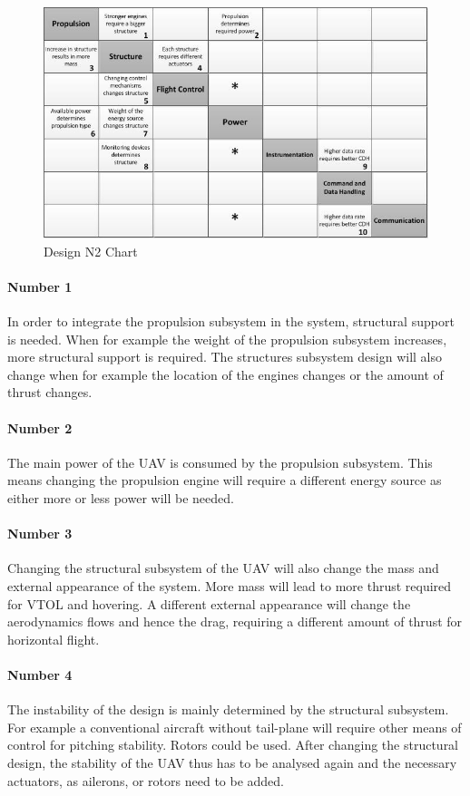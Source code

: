 \begin{figure}[htb]
\includegraphics[width=\textwidth]{./Interfaces/Figures/N2Chart.jpg}
\caption{Design N2 Chart}
\label{fig:N2}
\end{figure}

\paragraph{Number 1} In order to integrate the propulsion subsystem in the system, structural support is needed. When for example the weight of the propulsion subsystem increases, more structural support is required. The structures subsystem design will also change when for example the location of the engines changes or the amount of thrust changes.

\paragraph{Number 2} The main power of the UAV is consumed by the propulsion subsystem. This means changing the propulsion engine will require a different energy source as either more or less power will be needed.

\paragraph{Number 3} Changing the structural subsystem of the UAV will also change the mass and external appearance of the system. More mass will lead to more thrust required for VTOL and hovering. A different external appearance will change the aerodynamics flows and hence the drag, requiring a different amount of thrust for horizontal flight. 

\paragraph{Number 4} The instability of the design is mainly determined by the structural subsystem. For example a conventional aircraft without tail-plane will require other means of control for pitching stability. Rotors could be used. After changing the structural design, the stability of the UAV thus has to be analysed again and the necessary actuators, as ailerons, or rotors need to be added. 

